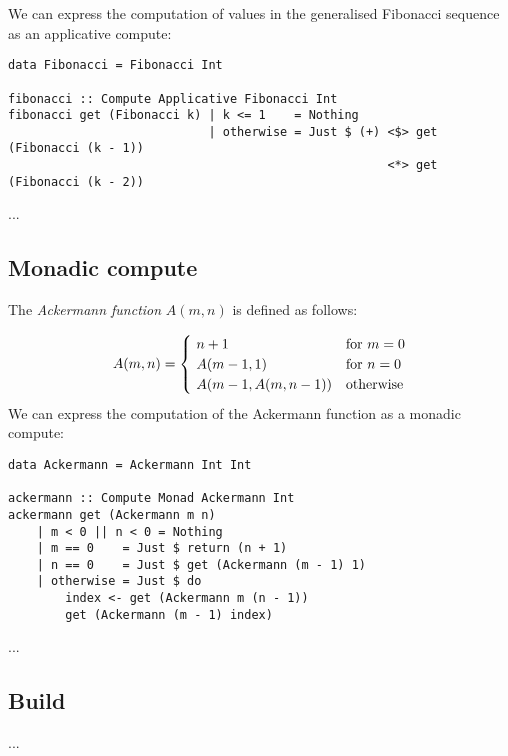 We can express the computation of values in the generalised Fibonacci sequence
as an applicative compute:

\begin{verbatim}
data Fibonacci = Fibonacci Int

fibonacci :: Compute Applicative Fibonacci Int
fibonacci get (Fibonacci k) | k <= 1    = Nothing
                            | otherwise = Just $ (+) <$> get (Fibonacci (k - 1))
                                                     <*> get (Fibonacci (k - 2))
\end{verbatim}

...

\subsection{Monadic compute}\label{sec-compute-monad}

The \emph{Ackermann function} $A(m, n)$ is defined as follows:

\[
A(m, n) = {\begin{cases}~n+1&{\text{for }}m=0\\~A(m-1, 1)&{\text{for }}n=0\\~A(m-1,A(m,n-1))&{\text{otherwise}}\end{cases}}
\vspace{2mm}
\]
\noindent
We can express the computation of the Ackermann function as a monadic compute:

\begin{verbatim}
data Ackermann = Ackermann Int Int

ackermann :: Compute Monad Ackermann Int
ackermann get (Ackermann m n)
    | m < 0 || n < 0 = Nothing
    | m == 0    = Just $ return (n + 1)
    | n == 0    = Just $ get (Ackermann (m - 1) 1)
    | otherwise = Just $ do
        index <- get (Ackermann m (n - 1))
        get (Ackermann (m - 1) index)
\end{verbatim}

...

\subsection{Build}\label{sec-general-build}

...
